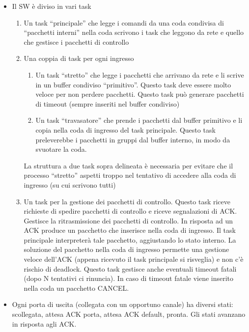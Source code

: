 \documentclass{article}
\begin{document}
\begin{itemize}
\item
Il SW \`e diviso in vari task
\begin{enumerate}
\item Un task ``principale'' che legge i comandi da una coda condivisa
  di ``pacchetti interni'' nella coda scrivono i task che leggono da
  rete e quello che gestisce i pacchetti di controllo 
\item Una coppia di task per ogni ingresso
\begin{enumerate}
\item Un task ``stretto'' che legge i pacchetti che arrivano da rete e
  li scrive in un buffer condiviso ``primitivo''.  Questo task deve
  essere molto veloce per non perdere pacchetti.  Questo task pu\`o
  generare pacchetti di timeout (sempre inseriti nel buffer condiviso) 
\item Un task ``travasatore'' che prende i pacchetti dal buffer
  primitivo e li copia nella coda di ingresso del task
  principale. Questo task preleverebbe i pacchetti in gruppi dal
  buffer interno, in modo da svuotare la coda. 
\end{enumerate}

La struttura a due task sopra delineata \`e necessaria per evitare che
il processo ``stretto'' aspetti troppo nel tentativo di accedere alla
coda di ingresso (su cui scrivono tutti) 

\item Un task per la gestione dei pacchetti di controllo.  Questo task
  riceve richieste di spedire pacchetti di controllo e riceve
  segnalazioni di ACK.  Gestisce la ritrasmissione dei pacchetti di
  controllo.  In risposta ad un ACK produce un pacchetto che inserisce
  nella coda di ingresso.  Il task principale interpreter\`a  tale
  pacchetto, aggiustando lo stato interno.  La soluzione del pacchetto
  nella coda di ingresso permette una gestione veloce dell'ACK (appena
  ricevuto il task principale si risveglia) e non c'\`e rischio di
  deadlock. Questo task gestisce anche eventuali timeout fatali (dopo
  N tentativi ci rinuncia).  In caso di timeout fatale viene inserito
  nella coda un pacchetto CANCEL. 
\end{enumerate}

\item Ogni porta di uscita (collegata con un opportuno canale) ha
diversi stati: scollegata, attesa ACK porta, attesa ACK default,
pronta.  Gli stati avanzano in risposta agli ACK. 
\end{itemize}
\end{document}
